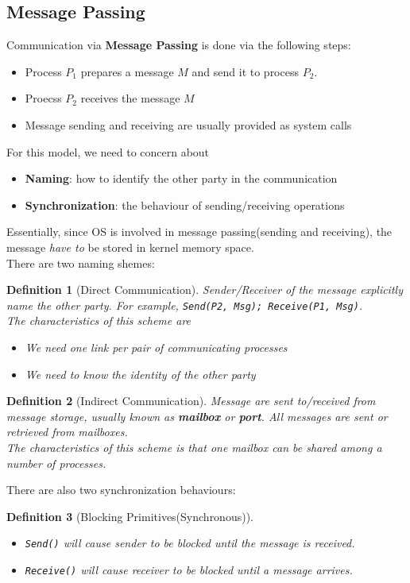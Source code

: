 \documentclass[11pt]{article}
\newtheorem{definition}{Definition}[section]
\theoremstyle{definition}
\begin{document}
\subsection{Message Passing}
Communication via \textbf{Message Passing} is done via the following steps:
\begin{itemize}[itemsep=0pt]
  \item Process $P_1$ prepares a message $M$ and send it to process $P_2$.
  \item Proecss $P_2$ receives the message $M$
  \item Message sending and receiving are usually provided as system calls
\end{itemize}
For this model, we need to concern about
\begin{itemize}[itemsep=0pt]
  \item \textbf{Naming}: how to identify the other party in the communication
  \item \textbf{Synchronization}: the behaviour of sending/receiving operations
\end{itemize}
Essentially, since OS is involved in message passing(sending and receiving), the message \textit{have to} be stored in kernel memory space.\\
There are two naming shemes:
\begin{definition}[Direct Communication]
\normalfont Sender/Receiver of the message explicitly name the other party. For example, \texttt{Send(P2, Msg); Receive(P1, Msg)}.\\
The characteristics of this scheme are
\begin{itemize}[itemsep=0pt]
  \item We need one link per pair of communicating processes
  \item We need to know the identity of the other party
\end{itemize}
\end{definition}
\begin{definition}[Indirect Communication]
\normalfont Message are sent to/received from message storage, usually known as \textbf{mailbox} or \textbf{port}. All messages are sent or retrieved from mailboxes.\\
The characteristics of this scheme is that one mailbox can be shared among a number of processes.
\end{definition}
There are also two synchronization behaviours:
\begin{definition}[Blocking Primitives(Synchronous)]
\normalfont 
\begin{itemize}[itemsep=0pt]
  \item \texttt{Send()} will cause sender to be blocked until the message is received.
  \item \texttt{Receive()} will cause receiver to be blocked until a message arrives.
\end{itemize}
\end{definition} 
\end{document}
